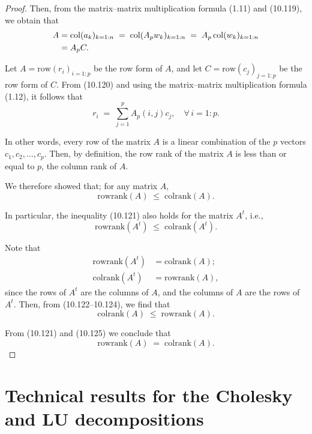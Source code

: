 \begin{proof}
Then, from the matrix--matrix multiplication formula (1.11) and (10.119), we obtain
that
\begin{align}
A &= \mathrm{col}(a_k)_{k=1:n} \;=\; \mathrm{col}(A_pw_k)_{k=1:n} \;=\;
A_p\,\mathrm{col}(w_k)_{k=1:n} \notag \\
&= A_pC.
\end{align}

Let $A = \mathrm{row}(r_i)_{i=1:p}$ be the row form of $A$, and let $C =
\mathrm{row}(c_j)_{j=1:p}$ be the row form of $C$. From (10.120) and using the
matrix--matrix multiplication formula (1.12), it follows that
\[
r_i \;=\; \sum_{j=1}^p A_p(i,j)c_j, \quad \forall\, i = 1:p.
\]

In other words, every row of the matrix $A$ is a linear combination of the $p$
vectors $c_1, c_2, \ldots, c_p$. Then, by definition, the row rank of the matrix $A$
is less than or equal to $p$, the column rank of $A$.

We therefore showed that; for any matrix $A$,
\begin{equation}
\mathrm{rowrank}(A) \;\le\; \mathrm{colrank}(A).
\end{equation}

In particular, the inequality (10.121) also holds for the matrix $A^t$, i.e.,
\begin{equation}
\mathrm{rowrank}(A^t) \;\le\; \mathrm{colrank}(A^t).
\end{equation}

Note that
\begin{align}
\mathrm{rowrank}(A^t) &= \mathrm{colrank}(A); \\
\mathrm{colrank}(A^t) &= \mathrm{rowrank}(A),
\end{align}
since the rows of $A^t$ are the columns of $A$, and the columns of $A$ are the rows
of $A^t$. Then, from (10.122--10.124), we find that
\begin{equation}
\mathrm{colrank}(A) \;\le\; \mathrm{rowrank}(A).
\end{equation}

From (10.121) and (10.125) we conclude that
\[
\mathrm{rowrank}(A) \;=\; \mathrm{colrank}(A).
\]
\end{proof}

\section{Technical results for the Cholesky and LU decompositions}


